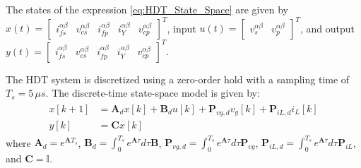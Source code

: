 The states of the expression \eqref{eq:HDT_State_Space} are given by $x(t) = \begin{bmatrix} i_{fs}^{\alpha\beta} & v_{cs}^{\alpha\beta} & i_{fp}^{\alpha\beta} & i_{Y}^{\alpha\beta} & v_{cp}^{\alpha\beta} \end{bmatrix}^T$, input $u(t) = \begin{bmatrix} v_s^{\alpha\beta} & v_p^{\alpha\beta} \end{bmatrix}^T$, and output \linebreak $y(t) = \begin{bmatrix} i_{fs}^{\alpha\beta} & v_{cs}^{\alpha\beta} & i_{fp}^{\alpha\beta} & i_{Y}^{\alpha\beta} & v_{cp}^{\alpha\beta} \end{bmatrix}^T$.

The HDT system is discretized using a zero-order hold with a sampling time of $T_s = 5\,\mu s$. The discrete-time state-space model is given by:
\begin{align}
    \begin{aligned}
        x[k+1] &= \mathbf{A}_d x[k] + \mathbf{B}_d u[k] + \mathbf{P}_{vg,d} v_g[k] + \mathbf{P}_{iL,d} i_L[k]\\
        y[k] &= \mathbf{C} x[k]
    \end{aligned}
\end{align}
where $\mathbf{A}_d = e^{\mathbf{A}T_s}$, $\mathbf{B}_d = \int_0^{T_s} e^{\mathbf{A}\tau} d\tau \mathbf{B}$, $\mathbf{P}_{vg,d} = \int_0^{T_s} e^{\mathbf{A}\tau} d\tau \mathbf{P}_{vg}$, $\mathbf{P}_{iL,d} = \int_0^{T_s} e^{\mathbf{A}\tau} d\tau \mathbf{P}_{iL}$, and $\mathbf{C} = \mathbb{I}$.

